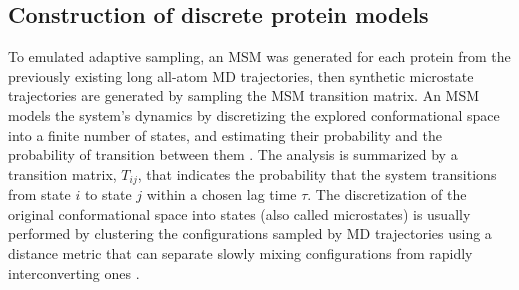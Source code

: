 \begin{table}[!ht]
\centering
\caption{Previously simulated proteins used to generate discrete models in this study}
\label{tab:dataset-summary}
\end{table}

\subsection{\label{sec:methods-msm}Construction of discrete protein models}

To emulated adaptive sampling, an MSM was generated for each protein from
the previously existing long all-atom MD trajectories, then synthetic
microstate trajectories are generated by sampling the MSM transition matrix.
An MSM models the system's dynamics by discretizing the explored
conformational space into a finite number of states, and estimating their
probability and the probability of transition between them \cite{prinz2011markov}.
The analysis is summarized by a transition matrix,
$T_{ij}$, that indicates the probability that the system transitions from state
$i$ to state $j$ within a chosen lag time $\tau$. The discretization of the
original conformational space into states (also called microstates) is usually
performed by clustering the configurations sampled by MD trajectories using
a distance metric that can separate slowly mixing configurations from rapidly
interconverting ones \cite{noe2016commute, Noe2015}.

